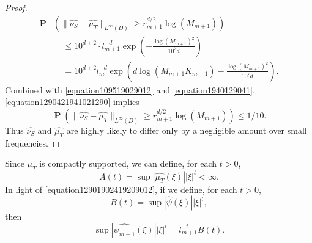 \documentclass[12pt,reqno]{article}
\numberwithin{equation}{section}
\DeclareMathOperator{\PP}{\mathbf{P}}
\begin{document}
\begin{proof}
\begin{equation}
    \begin{split}
        \PP& \left(\| \widehat{\nu_S} - \widehat{\mu_T} \|_{L^\infty(D)} \geq r_{m+1}^{d/2} \log(M_{m+1}) \right)\\
        &\ \ \ \ \ \leq 10^{d+2} \cdot l_{m+1}^{-d} \exp \left( - \frac{\log(M_{m+1})^2}{10^7 d} \right)\\
        &\ \ \ \ \ = 10^{d+2} l_m^{-d} \exp \left( d \log(M_{m+1} K_{m+1}) - \frac{\log(M_{m+1})^2}{10^7 d} \right).
    \end{split}
    \end{equation}
    Combined with \eqref{equation109519029012} and \eqref{equation1940129041}, \eqref{equation1290421941021290} implies
    \begin{equation} \label{equation0148912489128}
        \PP \left(\| \widehat{\nu_S} - \widehat{\mu_T} \|_{L^\infty(D)} \geq r_{m+1}^{d/2} \log(M_{m+1}) \right) \leq 1/10.
    \end{equation}
    Thus $\widehat{\nu_S}$ and $\widehat{\mu_T}$ are highly likely to differ only by a negligible amount over small frequencies.
\end{proof}

Since $\mu_T$ is compactly supported, we can define, for each $t > 0$,
%
\[ A(t) = \sup |\widehat{\mu_T}(\xi)| |\xi|^t < \infty. \]
%
In light of \eqref{equation12901902419209012}, if we define, for each $t > 0$,
%
\[ B(t) = \sup |\widehat{\psi}(\xi)| |\xi|^t, \]
%
then
%
\[ \sup |\widehat{\psi_{m+1}}(\xi)| |\xi|^t = l_{m+1}^{-t} B(t). \]
\end{document}
